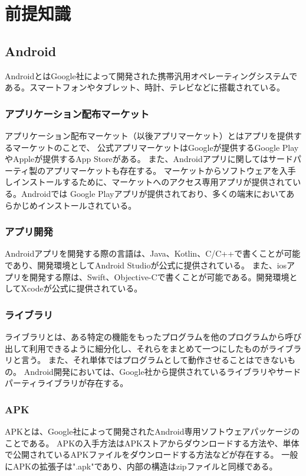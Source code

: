 \documentclass[a4j]{jarticle}
\begin{document}
\newpage
\section{前提知識}
\subsection{Android}
AndroidとはGoogle社によって開発された携帯汎用オペレーティングシステムである。スマートフォンやタブレット、時計、テレビなどに搭載されている。

\subsubsection{アプリケーション配布マーケット}
アプリケーション配布マーケット（以後アプリマーケット）とはアプリを提供するマーケットのことで、
公式アプリマーケットはGoogleが提供するGoogle PlayやAppleが提供するApp Storeがある。
また、Androidアプリに関してはサードパーティ製のアプリマーケットも存在する。
マーケットからソフトウェアを入手しインストールするために、マーケットへのアクセス専用アプリが提供されている。Androidでは
Google Playアプリが提供されており、多くの端末においてあらかじめインストールされている。
\subsubsection{アプリ開発}
Androidアプリを開発する際の言語は、Java、Kotlin、C/C++で書くことが可能であり、開発環境としてAndroid Studioが公式に提供されている。
また、iosアプリを開発する際は、Swift、Objective-Cで書くことが可能である。開発環境としてXcodeが公式に提供されている。
\subsubsection{ライブラリ}
ライブラリとは、ある特定の機能をもったプログラムを他のプログラムから呼び出して利用できるように細分化し、それらをまとめて一つにしたものがライブラリと言う。
また、それ単体ではプログラムとして動作させることはできないもの。
Android開発においては、Google社から提供されているライブラリやサードパーティライブラリが存在する。
\subsubsection{APK}
APKとは、Google社によって開発されたAndroid専用ソフトウェアパッケージのことである。
APKの入手方法はAPKストアからダウンロードする方法や、単体で公開されているAPKファイルをダウンロードする方法などが存在する。
一般にAPKの拡張子は".apk"であり、内部の構造はzipファイルと同様である。
\end{document}
